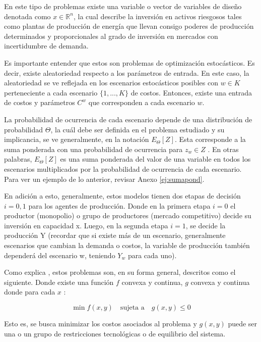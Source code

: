 En este tipo de problemas existe una variable o vector de variables de diseño denotada como  $x \in \mathbb{R}^{n}$, la cual describe la inversión en activos riesgosos tales como plantas de producción de energía que llevan consigo poderes de producción determinados y proporcionales al grado de inversión en mercados con incertidumbre de demanda.
\vspace{2.5mm}

Es importante entender que estos son problemas de optimización estocásticos. Es decir, existe aleatoriedad respecto a los parámetros de entrada. En este caso, la aleatoriedad se ve reflejada en los escenarios estocásticos posibles con $w \in K$  perteneciente a cada escenario $\{1,...,K\}$ de costos. Entonces, existe una entrada de costos y parámetros $C^{w}$ que corresponden a cada escenario $w$. 

La probabilidad de ocurrencia de cada escenario depende de una distribución de probabilidad $\Theta$, la cuál debe ser definida en el problema estudiado y su implicancia, se ve generalmente, en la notación $E_{\Theta}[Z]$. Esta corresponde a la suma ponderada con una probabilidad de ocurrencia para $z_{w} \in Z$ . En otras palabras, $E_{\Theta}[Z]$ es una suma ponderada del valor de una variable en todos los escenarios multiplicados por la probabilidad de ocurrencia de cada escenario. Para ver un ejemplo de lo anterior, revisar Anexo \ref{ej:sumapond}.

En adición a esto, generalmente, estos modelos tienen dos etapas de decisión $i={0,1}$ para los agentes de producción. Donde en la primera etapa $i=0$ el productor (monopolio) o grupo de productores (mercado competitivo) decide su inversión en capacidad x. Luego, en la segunda etapa $i=1$, se decide la producción Y (recordar que si existe más de un escenario, generalmente escenarios que cambian la demanda o costos, la variable de producción también dependerá del escenario w, teniendo $Y_{w}$ para cada uno).
\vspace{2.5mm}

Como explica , estos problemas son, en su forma general, descritos como el siguiente. Donde existe una función $f$ convexa y continua, $g$ convexa y continua donde para cada $x$ :

$$\min f(x,y)\quad\text{sujeta a}\quad g(x,y)\le 0$$

Esto es, se busca minimizar los costos asociados al problema y $g(x,y)$ puede ser una o un grupo de restricciones tecnológicas o de equilibrio del sistema.
\vspace{2.5mm}

